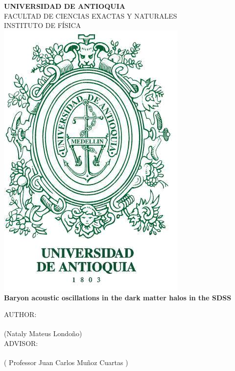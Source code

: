 \begin{titlepage}
\begin{center}
		{\normalsize  \textbf{UNIVERSIDAD DE ANTIOQUIA} }\\
		{\normalsize FACULTAD DE CIENCIAS EXACTAS Y NATURALES \\ INSTITUTO DE FÍSICA}
		\\[1cm]	
		\includegraphics[width = 3 cm]{Images/UdeA_Shield}
		\\[1.8cm]
				
		{\LARGE \textbf{Baryon acoustic oscillations in the dark matter halos in the SDSS}}
		\\[1.5cm]


		
		\vfill
						
		AUTHOR:	\\ [0.5cm]
		\underline{\hspace*{4in}} \\
		\footnotesize (Nataly Mateus Londoño) \\ [1cm]
		
		ADVISOR: \\ [0.5cm]
		\underline{\hspace*{4in}} \\
		\footnotesize ( Professor Juan Carlos Muñoz Cuartas )
				
	\end{center}		
\end{titlepage}

